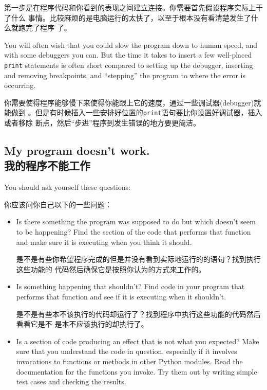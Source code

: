 \documentclass[10pt]{book}
\begin{document}
\begin{CJK}{UTF8}{gbsn}
第一步是在程序代码和你看到的表现之间建立连接。你需要首先假设程序实际上干了什么
事情。比较麻烦的是电脑运行的太快了，以至于根本没有看清楚发生了什么就跑完了程序
了。

You will often wish that you could slow the program down to human
speed, and with some debuggers you can.  But the time it takes to
insert a few well-placed {\tt print} statements is often short compared to
setting up the debugger, inserting and removing breakpoints, and
``stepping'' the program to where the error is occurring.

你需要使得程序能够慢下来使得你能跟上它的速度，通过一些调试器(debugger)就能做到
。但是有时候插入一些安排好位置的{\tt print}语句要比你设置好调试器，插入或者移除
断点，然后``步进''程序到发生错误的地方要更简洁。

\subsection{My program doesn't work.\\我的程序不能工作}

You should ask yourself these questions:

你应该问你自己以下的一些问题：

\begin{itemize}

\item Is there something the program was supposed to do but
which doesn't seem to be happening?  Find the section of the code
that performs that function and make sure it is executing when
you think it should.

是不是有些你希望程序完成的但是并没有看到实际地运行的的语句？找到执行这些功能的
代码然后确保它是按照你认为的方式来工作的。

\item Is something happening that shouldn't?  Find code in
your program that performs that function and see if it is
executing when it shouldn't.

是不是有些本不该执行的代码却运行了？找到程序中执行这些功能的代码然后看看它是不
是本不应该执行的却执行了。

\item Is a section of code producing an effect that is not
what you expected?  Make sure that you understand the code in
question, especially if it involves invocations to functions or methods in
other Python modules.  Read the documentation for the functions you invoke.
Try them out by writing simple test cases and checking the results.


\end{itemize}
\end{CJK}
\end{document}
